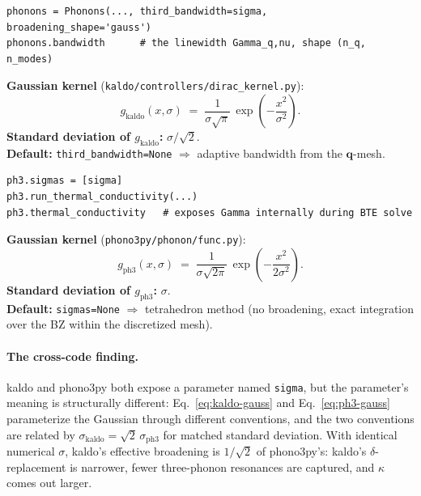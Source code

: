 \documentclass[11pt,a4paper]{article}
\begin{document}
\begin{kaldobox}
\begin{verbatim}
phonons = Phonons(..., third_bandwidth=sigma, broadening_shape='gauss')
phonons.bandwidth      # the linewidth Gamma_q,nu, shape (n_q, n_modes)
\end{verbatim}
\textbf{Gaussian kernel} (\texttt{kaldo/controllers/dirac\_kernel.py}):
\begin{equation}
  g_{\mathrm{kaldo}}(x, \sigma)
  \;=\; \frac{1}{\sigma\sqrt{\pi}}\,\exp\!\left(-\frac{x^2}{\sigma^2}\right).
  \label{eq:kaldo-gauss}
\end{equation}
\textbf{Standard deviation of $g_{\mathrm{kaldo}}$:} $\sigma/\sqrt{2}$.\\
\textbf{Default:} \texttt{third\_bandwidth=None} $\Rightarrow$ adaptive bandwidth from the
$\mathbf{q}$-mesh.
\end{kaldobox}

\begin{phonobox}
\begin{verbatim}
ph3.sigmas = [sigma]
ph3.run_thermal_conductivity(...)
ph3.thermal_conductivity   # exposes Gamma internally during BTE solve
\end{verbatim}
\textbf{Gaussian kernel} (\texttt{phono3py/phonon/func.py}):
\begin{equation}
  g_{\mathrm{ph3}}(x, \sigma)
  \;=\; \frac{1}{\sigma\sqrt{2\pi}}\,\exp\!\left(-\frac{x^2}{2\sigma^2}\right).
  \label{eq:ph3-gauss}
\end{equation}
\textbf{Standard deviation of $g_{\mathrm{ph3}}$:} $\sigma$.\\
\textbf{Default:} \texttt{sigmas=None} $\Rightarrow$ tetrahedron method (no broadening,
exact integration over the BZ within the discretized mesh).
\end{phonobox}

\paragraph{The cross-code finding.} kaldo and phono3py both expose a parameter named
\texttt{sigma}, but the parameter's meaning is structurally different:
Eq.~\eqref{eq:kaldo-gauss} and Eq.~\eqref{eq:ph3-gauss} parameterize the Gaussian
through different conventions, and the two conventions are related by
$\sigma_{\mathrm{kaldo}} = \sqrt{2}\,\sigma_{\mathrm{ph3}}$ for matched standard
deviation. With identical numerical $\sigma$, kaldo's effective broadening is
$1/\sqrt{2}$ of phono3py's: kaldo's $\delta$-replacement is narrower, fewer
three-phonon resonances are captured, and $\kappa$ comes out larger.
\end{document}
